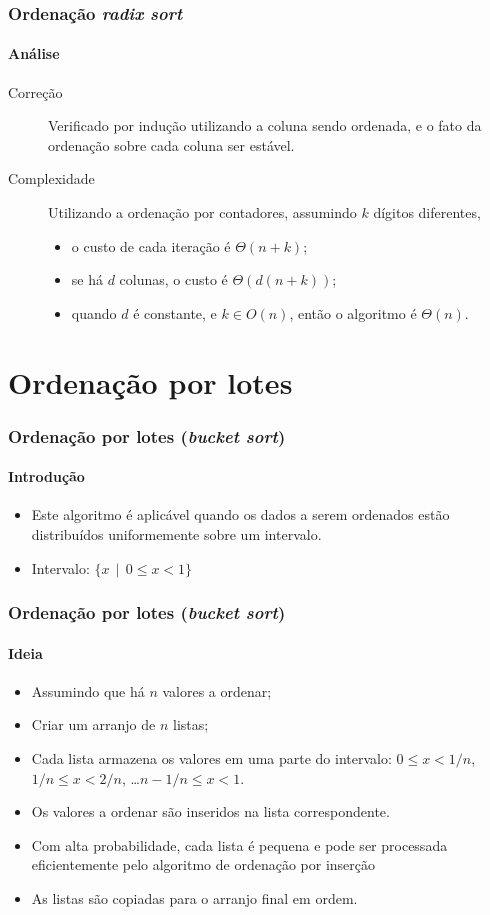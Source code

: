 \documentclass{beamer}
\begin{document}
\begin{frame}
  \frametitle{Ordenação \textit{radix sort\/}}
  \framesubtitle{Análise}

  \begin{description}
  \item[Correção] Verificado por indução utilizando a coluna sendo ordenada, 
    e o fato da ordenação sobre cada coluna ser estável.
  \item[Complexidade] Utilizando a ordenação por contadores, assumindo $k$ dígitos diferentes,
    \begin{itemize}
      \item o custo de cada iteração é $\Theta(n+k)$;
      \item se há $d$ colunas, o custo é $\Theta(d(n+k))$;
      \item quando $d$ é constante, e $k \in O(n)$, então o algoritmo é $\Theta(n)$.
    \end{itemize}
  \end{description}

\end{frame}

\section{Ordenação por lotes}

\begin{frame}
\frametitle{Ordenação por lotes (\textit{bucket sort\/})}
\framesubtitle{Introdução}

\begin{itemize}
  \item Este algoritmo é aplicável quando os dados a serem ordenados
    estão distribuídos \alert{uniformemente} sobre um intervalo.
  \item Intervalo: $\{x \, \mid \, 0 \le x < 1\}$
\end{itemize}

\end{frame}

\begin{frame}
\frametitle{Ordenação por lotes (\textit{bucket sort\/})}
\framesubtitle{Ideia}

\begin{itemize}
  \item Assumindo que há $n$ valores a ordenar;
  \item Criar um arranjo de $n$ listas;
  \item Cada lista armazena os valores em uma parte do intervalo: $0 \le x < 1/n$, $1/n \le x < 2/n$,
    \ldots $n-1/n \le x < 1$.
  \item Os valores a ordenar são inseridos na lista correspondente.
  \item Com alta probabilidade, cada lista é pequena e pode ser processada eficientemente pelo algoritmo de ordenação por inserção
  \item As listas são copiadas para o arranjo final em ordem.
\end{itemize}

\end{frame}
\end{document}
